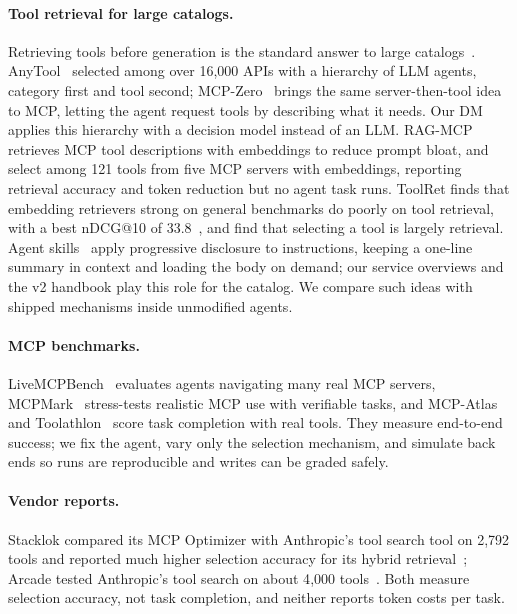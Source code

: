 \documentclass[11pt]{article}
\begin{document}
\paragraph{Tool retrieval for large catalogs.} Retrieving tools before generation is the standard answer to large
catalogs~\citep{qin2023toolllm,oats2026}. AnyTool~\citep{du2024anytool} selected among over 16{,}000 APIs with a
hierarchy of LLM agents, category first and tool second; MCP-Zero~\citep{fei2025mcpzero} brings the same
server-then-tool idea to MCP, letting the agent request tools by describing what it needs. Our DM applies this
hierarchy with a decision model instead of an LLM. RAG-MCP~\citep{gan2025ragmcp} retrieves MCP tool descriptions
with embeddings to reduce prompt bloat, and \citet{mudunuri2026semantic} select among 121 tools from five MCP
servers with embeddings, reporting retrieval accuracy and token reduction but no agent task runs. ToolRet finds
that embedding retrievers strong on general benchmarks do poorly on tool retrieval, with a best nDCG@10 of
33.8~\citep{shi2025toolret}, and \citet{selection2026retrieval} find that selecting a tool is largely retrieval.
Agent skills~\citep{anthropic2025skills} apply progressive disclosure to instructions, keeping a one-line summary
in context and loading the body on demand; our service overviews and the v2 handbook play this role for the
catalog. We compare such ideas with shipped mechanisms inside unmodified agents.

\paragraph{MCP benchmarks.} LiveMCPBench~\citep{mo2025livemcpbench} evaluates agents navigating many real MCP
servers, MCPMark~\citep{wu2025mcpmark} stress-tests realistic MCP use with verifiable tasks, and
MCP-Atlas~\citep{mcpatlas2026} and Toolathlon~\citep{toolathlon2025} score task completion with real tools. They
measure end-to-end success; we fix the agent, vary only the selection mechanism, and simulate back ends so runs
are reproducible and writes can be graded safely.

\paragraph{Vendor reports.} Stacklok compared its MCP Optimizer with Anthropic's tool search tool on 2{,}792 tools
and reported much higher selection accuracy for its hybrid retrieval~\citep{stacklok2025optimizer}; Arcade tested
Anthropic's tool search on about 4{,}000 tools~\citep{arcade2025toolsearch}. Both measure selection accuracy, not
task completion, and neither reports token costs per task.
\end{document}
